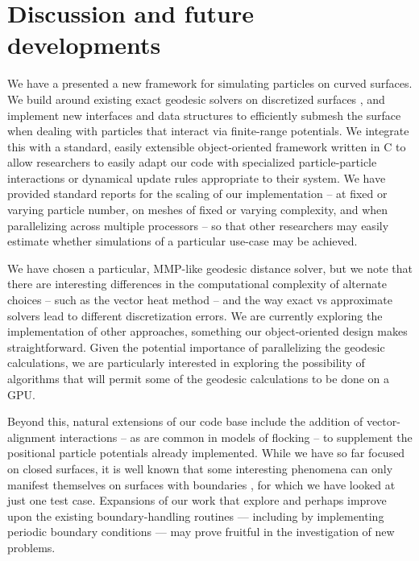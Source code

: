 \documentclass[preprint,12pt]{elsarticle}
\newcommand\CC{C\nolinebreak[4]\hspace{-.05em}\raisebox{.4ex}{\relsize{-3}{\textbf{++}}}}
\begin{document}
\section{Discussion and future developments}\label{sec:conclusion}

We have a presented a new framework for simulating particles on curved surfaces. We build around existing exact geodesic solvers on discretized surfaces \cite{xin2009improving}, and implement new interfaces and data structures to efficiently submesh the surface when dealing with particles that interact via finite-range potentials. We integrate this with a standard, easily extensible object-oriented framework written in \CC{} to allow researchers to easily adapt our code with specialized particle-particle interactions or dynamical update rules appropriate to their system. We have provided standard reports for the scaling of our implementation -- at fixed or varying particle number, on meshes of fixed or varying complexity, and when parallelizing across multiple processors -- so that other researchers may easily estimate whether simulations of a particular use-case may be achieved. 

We have chosen a particular, MMP-like geodesic distance solver, but we note that there are interesting differences in the computational complexity of alternate choices -- such as the vector heat method \cite{sharp2019vector} -- and the way exact vs approximate solvers lead to different discretization errors. We are currently exploring the implementation of other approaches, something our object-oriented design makes straightforward. Given the potential importance of parallelizing the geodesic calculations, we are particularly interested in exploring the possibility of algorithms that will permit some of the geodesic calculations to be done on a GPU. 

Beyond this, natural extensions of our code base include the addition of vector-alignment interactions -- as  are common in models of flocking \cite{vicsek1995novel} -- to supplement the positional particle potentials already implemented. While we have so far focused on closed surfaces, it is well known that some interesting phenomena can only manifest themselves on surfaces with boundaries \cite{giomi2007crystalline}, for which we have looked at just one test case. Expansions of our work that explore and perhaps improve upon the existing boundary-handling routines --- including by implementing periodic boundary conditions --- may prove fruitful in the investigation of new problems.
\end{document}
